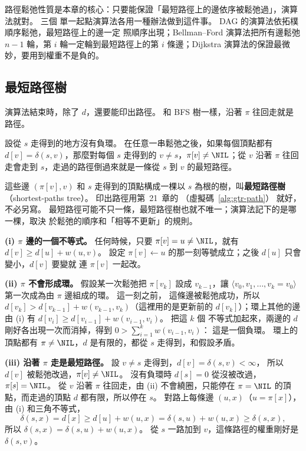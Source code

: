 路徑鬆弛性質是本章的核心：只要能保證「最短路徑上的邊依序被鬆弛過」，演算法就對。 三個
單一起點演算法各用一種辦法做到這件事。 DAG 的演算法依拓樸順序鬆弛，最短路徑上的邊一定
照順序出現；Bellman--Ford 演算法把所有邊鬆弛 $n - 1$ 輪，第 $i$ 輪一定輪到最短路徑上的第
$i$ 條邊；Dijkstra 演算法的保證最微妙，要用到權重不是負的。

\subsection{最短路徑樹}

演算法結束時，除了 $d$，還要能印出路徑。 和 BFS 樹一樣，沿著 $\pi$ 往回走就是路徑。

\begin{theorem}
\label{thm:spt-tree}
設從 $s$ 走得到的地方沒有負環。 在任意一串鬆弛之後，如果每個頂點都有 $d[v] = \delta(s,
v)$，那麼對每個 $s$ 走得到的 $v \ne s$，$\pi[v] \ne \NIL$；從 $v$ 沿著 $\pi$ 往回走會走到
$s$，走過的路徑倒過來就是一條從 $s$ 到 $v$ 的最短路徑。
\end{theorem}

這些邊 $(\pi[v], v)$ 和 $s$ 走得到的頂點構成一棵以 $s$ 為根的樹，叫\textbf{最短路徑樹}
（shortest-paths tree）。 印出路徑用第~21~章的 （虛擬碼~\ref{alg:gtr-path}）
就好，不必另寫。 最短路徑可能不只一條，最短路徑樹也就不唯一；演算法記下的是哪一棵，取決
於鬆弛的順序和「相等不更新」的規則。

\begin{whybox}
\textbf{(i) $\pi$ 邊的一個不等式。} 任何時候，只要 $\pi[v] = u \ne \NIL$，就有 $d[v] \ge d[u]
+ w(u, v)$。 設定 $\pi[v] \gets u$ 的那一刻等號成立；之後 $d[u]$ 只會變小，$d[v]$ 要變就
連 $\pi[v]$ 一起改。

\textbf{(ii) $\pi$ 不會形成環。} 假設某一次鬆弛把 $\pi[v_k]$ 設成 $v_{k-1}$，讓
$\langle v_0, v_1, \ldots, v_k = v_0 \rangle$ 第一次成為由 $\pi$ 邊組成的環。 這一刻之前，
這條邊被鬆弛成功，所以 $d[v_k] > d[v_{k-1}] + w(v_{k-1}, v_k)$（這裡用的是更新前的
$d[v_k]$）；環上其他的邊由 (i) 有 $d[v_i] \ge d[v_{i-1}] + w(v_{i-1}, v_i)$。 把這 $k$ 個
不等式加起來，兩邊的 $d$ 剛好各出現一次而消掉，得到 $0 > \sum_{i=1}^{k} w(v_{i-1}, v_i)$：
這是一個負環。 環上的頂點都有 $\pi \ne \NIL$，$d$ 是有限的，都從 $s$ 走得到，和假設矛盾。

\textbf{(iii) 沿著 $\pi$ 走是最短路徑。} 設 $v \ne s$ 走得到，$d[v] = \delta(s, v) < \infty$，
所以 $d[v]$ 被鬆弛改過，$\pi[v] \ne \NIL$。 沒有負環時 $d[s] = 0$ 從沒被改過，$\pi[s] = \NIL$。
從 $v$ 沿著 $\pi$ 往回走，由 (ii) 不會繞圈，只能停在 $\pi = \NIL$ 的頂點，而走過的頂點 $d$
都有限，所以停在 $s$。 對路上每條邊 $(u, x)$（$u = \pi[x]$），由 (i) 和三角不等式，
\[
\delta(s, x) = d[x] \ge d[u] + w(u, x) = \delta(s, u) + w(u, x) \ge \delta(s, x),
\]
所以 $\delta(s, x) = \delta(s, u) + w(u, x)$。 從 $s$ 一路加到 $v$，這條路徑的權重剛好是
$\delta(s, v)$。
\end{whybox}

